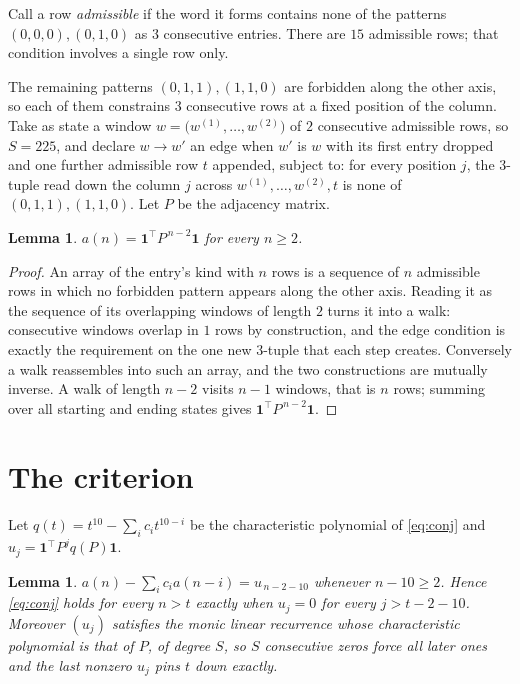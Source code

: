 \documentclass[11pt,a4paper]{article}
\theoremstyle{plain}
\newtheorem{lemma}[theorem]{Lemma}
\theoremstyle{definition}
\begin{document}
Call a row \emph{admissible} if the word it forms contains none of the patterns
$(0,0,0), (0,1,0)$ as $3$ consecutive entries. There are $15$ admissible rows; that condition
involves a single row only.

The remaining patterns $(0,1,1), (1,1,0)$ are forbidden along the other axis, so each of them
constrains $3$ consecutive rows at a fixed position of the column. Take as state a
window $w=\bigl(w^{(1)},\dots,w^{(2)}\bigr)$ of $2$ consecutive admissible
rows, so $S=225$, and declare $w\to w'$ an edge when $w'$ is $w$ with its first entry
dropped and one further admissible row $t$ appended, subject to: for every position
$j$, the $3$-tuple read down the column $j$ across $w^{(1)},\dots,w^{(2)},t$
is none of $(0,1,1), (1,1,0)$. Let $P$ be the adjacency matrix.

\begin{lemma}\label{lem:walk}
$a(n)=\mathbf{1}^{\!\top}P^{\,n-2}\mathbf{1}$ for every $n\ge2$.
\end{lemma}

\begin{proof}
An array of the entry's kind with $n$ rows is a sequence of $n$ admissible rows in
which no forbidden pattern appears along the other axis. Reading it as the sequence of its
overlapping windows of length $2$ turns it into a walk: consecutive windows overlap in
$1$ rows by construction, and the edge condition is exactly the requirement on the one
new $3$-tuple that each step creates. Conversely a walk reassembles into such an array,
and the two constructions are mutually inverse. A walk of length $n-2$ visits $n-1$
windows, that is $n$ rows; summing over all starting and ending states gives
$\mathbf{1}^{\!\top}P^{\,n-2}\mathbf{1}$.
\end{proof}

\section{The criterion}

Let $q(t)=t^{10}-\sum_i c_i t^{10-i}$ be the characteristic polynomial of
\eqref{eq:conj} and $u_j=\mathbf{1}^{\!\top}P^{j}q(P)\mathbf{1}$.

\begin{lemma}\label{lem:crit}
$a(n)-\sum_i c_i a(n-i)=u_{\,n-2-10}$ whenever $n-10\ge2$. Hence
\eqref{eq:conj} holds for every $n>t$ exactly when $u_j=0$ for every
$j>t-2-10$. Moreover $(u_j)$ satisfies the monic linear recurrence whose
characteristic polynomial is that of $P$, of degree $S$, so $S$ consecutive zeros force all
later ones and the last nonzero $u_j$ pins $t$ down exactly.
\end{lemma}
\end{document}
